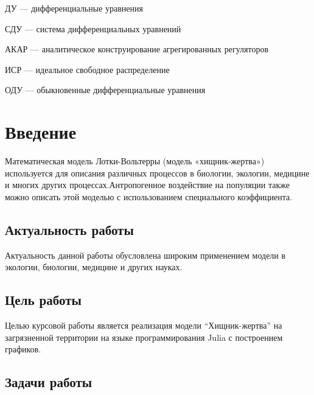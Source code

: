 \documentclass[
  13pt,
  fontsize=13pt,
  russian,
  a4paper,
,captions=tableheading
]{scrreprt}
\begin{document}
ДУ --- дифференциальные уравнения

СДУ --- система дифференциальных уравнений

АКАР --- аналитическое конструирование агрегированных регуляторов

ИСР --- идеальное свободное распределение

ОДУ --- обыкновенные дифференциальные уравнения

\hypertarget{ux432ux432ux435ux434ux435ux43dux438ux435}{%
\chapter*{Введение}\label{ux432ux432ux435ux434ux435ux43dux438ux435}}

Математическая модель Лотки-Вольтерры (модель «хищник-жертва»)
используется для описания различных процессов в биологии, экологии,
медицине и многих других процессах.Антропогенное воздействие на
популяции также можно описать этой моделью с использованием специального
коэффициента.

\hypertarget{ux430ux43aux442ux443ux430ux43bux44cux43dux43eux441ux442ux44c-ux440ux430ux431ux43eux442ux44b}{%
\section*{Актуальность
работы}\label{ux430ux43aux442ux443ux430ux43bux44cux43dux43eux441ux442ux44c-ux440ux430ux431ux43eux442ux44b}}

Актуальность данной работы обусловлена широким применением модели в
экологии, биологии, медицине и других науках.

\hypertarget{ux446ux435ux43bux44c-ux440ux430ux431ux43eux442ux44b}{%
\section*{Цель
работы}\label{ux446ux435ux43bux44c-ux440ux430ux431ux43eux442ux44b}}

Целью курсовой работы является реализация модели ``Хищник-жертва'' на
загрязненной территории на языке программирования Julia с построением
графиков.

\hypertarget{ux437ux430ux434ux430ux447ux438-ux440ux430ux431ux43eux442ux44b}{%
\section*{Задачи
работы}\label{ux437ux430ux434ux430ux447ux438-ux440ux430ux431ux43eux442ux44b}}
\end{document}
